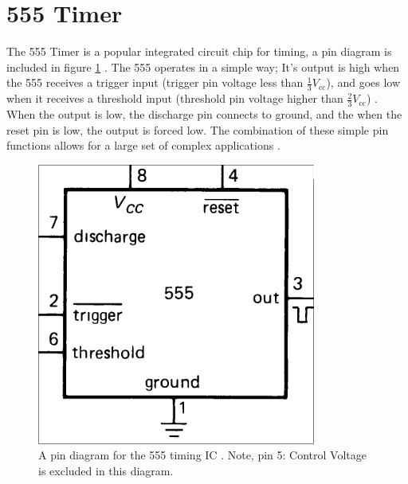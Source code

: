 \documentclass[%
 reprint,
 amsmath,amssymb,
 aps,
]{revtex4-2}
\begin{document}
\section{555 Timer}
The 555 Timer is a popular integrated circuit chip for timing, a pin diagram is included in figure \ref{fig:555} \cite{horowitz}. The 555 operates in a simple way; It's output is high when the 555 receives a trigger input (trigger pin voltage less than $\frac{1}{3}V_{\text{cc}}$), and goes low when it receives a threshold input (threshold pin voltage higher than $\frac{2}{3}V_\text{cc}$) \cite{horowitz}. When the output is low, the discharge pin connects to ground, and the when the reset pin is low, the output is forced low. The combination of these simple pin functions allows for a large set of complex applications \cite{horowitz}.

\begin{figure}
    \includegraphics[width=0.7\columnwidth]{Images/555Pins.png}
    \caption{\label{fig:555}A pin diagram for the 555 timing IC \cite{horowitz}. Note, pin 5: Control Voltage is excluded in this diagram.}
\end{figure}
    
\end{document}
